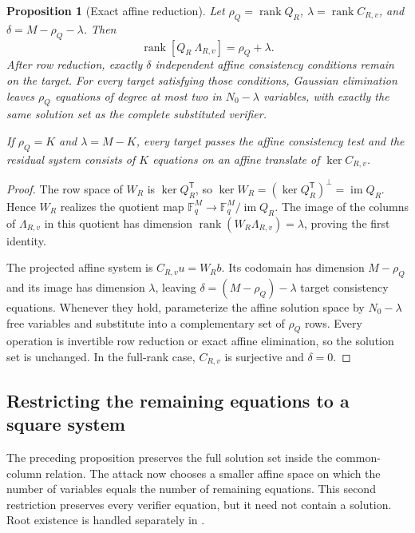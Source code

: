 \documentclass[11pt]{article}
\newtheorem{proposition}[theorem]{Proposition}
\newcommand{\F}{\mathbb F}
\newcommand{\rank}{\operatorname{rank}}
\newcommand{\im}{\operatorname{im}}
\newcommand{\transpose}{\mathsf T}
\begin{document}
\begin{proposition}[Exact affine reduction]\label{prop:exact-affine}
Let $\rho_Q=\rank Q_R$, $\lambda=\rank C_{R,v}$, and
$\delta=M-\rho_Q-\lambda$.  Then
\[
  \rank[Q_R\ \Lambda_{R,v}]=\rho_Q+\lambda.
\]
After row reduction, exactly $\delta$ independent affine consistency
conditions remain on the target.  For every target satisfying those
conditions, Gaussian elimination leaves $\rho_Q$ equations of degree at most
two in $N_0-\lambda$ variables, with exactly the same solution set as the
complete substituted verifier.

If $\rho_Q=K$ and $\lambda=M-K$, every target passes the affine consistency
test and the residual system consists of $K$ equations on an affine translate
of $\ker C_{R,v}$.
\end{proposition}

\begin{proof}
The row space of $W_R$ is $\ker Q_R^\transpose$, so
$\ker W_R=(\ker Q_R^\transpose)^\perp=\im Q_R$.  Hence $W_R$ realizes the
quotient map $\F_q^M\to\F_q^M/\im Q_R$.  The image of the columns of
$\Lambda_{R,v}$ in this quotient has dimension
$\rank(W_R\Lambda_{R,v})=\lambda$, proving the first identity.

The projected affine system is $C_{R,v}u=W_Rb$.  Its codomain has dimension
$M-\rho_Q$ and its image has dimension $\lambda$, leaving
$\delta=(M-\rho_Q)-\lambda$ target consistency equations.  Whenever they
hold, parameterize the affine solution space by $N_0-\lambda$ free variables
and substitute into a complementary set of $\rho_Q$ rows.  Every operation is
invertible row reduction or exact affine elimination, so the solution set is
unchanged.  In the full-rank case, $C_{R,v}$ is surjective and $\delta=0$.
\end{proof}

\subsection{Restricting the remaining equations to a square system}
The preceding proposition preserves the full solution set inside the
common-column relation.  The attack now chooses a smaller affine space on
which the number of variables equals the number of remaining equations.  This
second restriction preserves every verifier equation, but it need not contain
a solution.  Root existence is handled separately in
.
\end{document}
